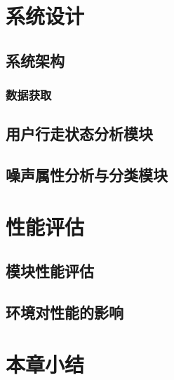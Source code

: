 \section{系统设计}

\subsection{系统架构}

\subsubsection{数据获取}

\subsection{用户行走状态分析模块}

\subsection{噪声属性分析与分类模块}





\section{性能评估}

\subsection{模块性能评估}
\subsection{环境对性能的影响}



\section{本章小结}







